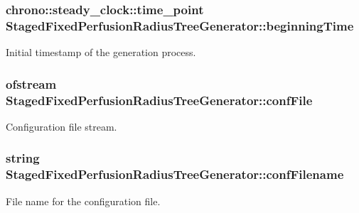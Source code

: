\subsubsection[{\texorpdfstring{beginning\+Time}{beginningTime}}]{\setlength{\rightskip}{0pt plus 5cm}chrono\+::steady\+\_\+clock\+::time\+\_\+point Staged\+Fixed\+Perfusion\+Radius\+Tree\+Generator\+::beginning\+Time\hspace{0.3cm}{\ttfamily [protected]}}\hypertarget{class_staged_fixed_perfusion_radius_tree_generator_abedb9de1a91a14d309a0119bb1bb48b8}{}\label{class_staged_fixed_perfusion_radius_tree_generator_abedb9de1a91a14d309a0119bb1bb48b8}
Initial timestamp of the generation process. 
\subsubsection[{\texorpdfstring{conf\+File}{confFile}}]{\setlength{\rightskip}{0pt plus 5cm}ofstream Staged\+Fixed\+Perfusion\+Radius\+Tree\+Generator\+::conf\+File\hspace{0.3cm}{\ttfamily [protected]}}\hypertarget{class_staged_fixed_perfusion_radius_tree_generator_a63c72bcaee798846d0dbc253faea577d}{}\label{class_staged_fixed_perfusion_radius_tree_generator_a63c72bcaee798846d0dbc253faea577d}
Configuration file stream. 
\subsubsection[{\texorpdfstring{conf\+Filename}{confFilename}}]{\setlength{\rightskip}{0pt plus 5cm}string Staged\+Fixed\+Perfusion\+Radius\+Tree\+Generator\+::conf\+Filename\hspace{0.3cm}{\ttfamily [private]}}\hypertarget{class_staged_fixed_perfusion_radius_tree_generator_ab8dbc505effc0a2daf797f03741a8238}{}\label{class_staged_fixed_perfusion_radius_tree_generator_ab8dbc505effc0a2daf797f03741a8238}
File name for the configuration file. 
